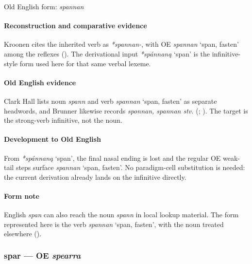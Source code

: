 \documentclass[
  british,
  a4paper,
]{article}
\providecommand{\Recon}[1]{\emph{*#1}}
\begin{document}
Old English form: \emph{spannan}

\paragraph{Reconstruction and comparative
evidence}\label{reconstruction-and-comparative-evidence-56}

Kroonen cites the inherited verb as \emph{*spannan-}, with OE
{\emph{spannan}} `span, fasten' among the reflexes
(). The derivational input
\Recon{spánnaną} `span' is the infinitive-style form used here for that
same verbal lexeme.

\paragraph{Old English evidence}\label{old-english-evidence-58}

Clark Hall lists noun \emph{spann} and verb {\emph{spannan}} `span,
fasten' as separate headwords, and Brunner likewise records
\emph{sponnan, spannan stv.} (; ). The target is
the strong-verb infinitive, not the noun.

\paragraph{Development to Old
English}\label{development-to-old-english-57}

From \Recon{spánnaną} `span', the final nasal ending is lost and the
regular OE weak-tail steps surface {\emph{spannan}} `span, fasten'. No
paradigm-cell substitution is needed: the current derivation already
lands on the infinitive directly.

\paragraph{Form note}\label{form-note-17}

English \emph{span} can also reach the noun \emph{spann} in local lookup
material. The form represented here is the verb {\emph{spannan}} `span,
fasten', with the noun treated elsewhere
().

\subsubsection{\texorpdfstring{spar --- OE
\emph{spearra}}{spar --- OE spearra}}\label{spar-oe-spearra}
\end{document}
